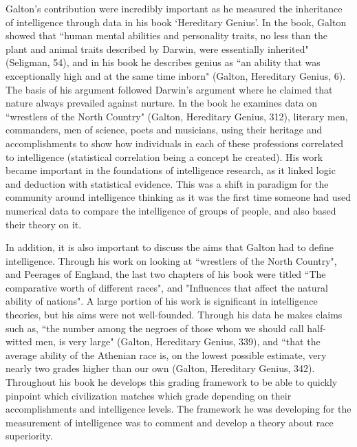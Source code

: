 \documentclass[12pt, oneside]{article}
\begin{document}
\par Galton's contribution were incredibly important as he measured the inheritance of intelligence through data in his book `Hereditary Genius'. In the book, Galton showed that ``human mental abilities and personality traits, no less than the plant and animal traits described by Darwin, were essentially inherited" (Seligman, 54), and in his book he describes genius as ``an ability that was exceptionally high and at the same time inborn" (Galton, Hereditary Genius, 6). The basis of his argument followed Darwin's argument where he claimed that nature always prevailed against nurture. In the book he examines data on ``wrestlers of the North Country" (Galton, Hereditary Genius, 312), literary men, commanders, men of science, poets and musicians, using their heritage and accomplishments to show how individuals in each of these professions correlated to intelligence (statistical correlation being a concept he created). His work became important in the foundations of intelligence research, as it linked logic and deduction with statistical evidence. This was a shift in paradigm for the community around intelligence thinking as it was the first time someone had used numerical data to compare the intelligence of groups of people, and also based their theory on it.

\par In addition, it is also important to discuss the aims that Galton had to define intelligence. Through his work on looking at ``wrestlers of the North Country", and Peerages of England, the last two chapters of his book were titled ``The comparative worth of different races", and "Influences that affect the natural ability of nations". A large portion of his work is significant in intelligence theories, but his aims were not well-founded. Through his data he makes claims such as, ``the number among the negroes of those whom we should call half-witted men, is very large" (Galton, Hereditary Genius, 339), and ``that the average ability of the Athenian race is, on the lowest possible estimate, very nearly two grades higher than our own (Galton, Hereditary Genius, 342). Throughout his book he develops this grading framework to be able to quickly pinpoint which civilization matches which grade depending on their accomplishments and intelligence levels. The framework he was developing for the measurement of intelligence was to comment and develop a theory about race superiority.
\end{document}
